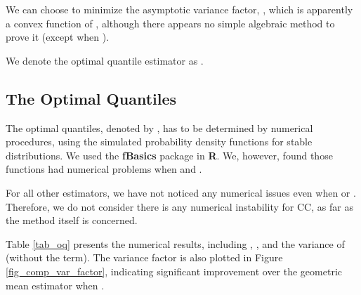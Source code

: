 \documentclass[oneside,10pt]{article}
\begin{document}
We can choose  to minimize the asymptotic variance factor,
, which is apparently a convex function of , although there appears no simple algebraic method to prove it (except when ).

We denote the optimal quantile estimator as .

\subsection{The Optimal Quantiles}

The optimal quantiles, denoted by , has to be determined by numerical procedures, using the simulated probability density functions for stable distributions. We used the \textbf{fBasics} package in \textbf{R}. We, however, found those functions had numerical problems when  and .

For all other estimators, we have not noticed any numerical issues even when  or . Therefore, we do not consider there is any numerical instability for CC, as far as the method itself is concerned.



Table \ref{tab_oq} presents the numerical results, including ,  , and the variance of  (without the  term). The variance factor is also plotted in Figure \ref{fig_comp_var_factor}, indicating significant improvement over the geometric mean estimator when .
\end{document}

